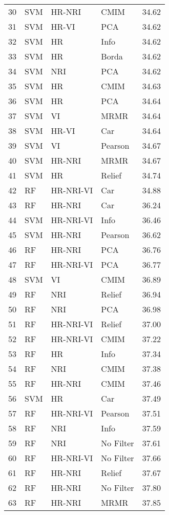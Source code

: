 \begin{table}[ht]
\begin{tabular}{rlllr}
  30 & SVM & HR-NRI & CMIM & 34.62 \\ 
  31 & SVM & HR-VI & PCA & 34.62 \\ 
  32 & SVM & HR & Info & 34.62 \\ 
  33 & SVM & HR & Borda & 34.62 \\ 
  34 & SVM & NRI & PCA & 34.62 \\ 
  35 & SVM & HR & CMIM & 34.63 \\ 
  36 & SVM & HR & PCA & 34.64 \\ 
  37 & SVM & VI & MRMR & 34.64 \\ 
  38 & SVM & HR-VI & Car & 34.64 \\ 
  39 & SVM & VI & Pearson & 34.67 \\ 
  40 & SVM & HR-NRI & MRMR & 34.67 \\ 
  41 & SVM & HR & Relief & 34.74 \\ 
  42 & RF & HR-NRI-VI & Car & 34.88 \\ 
  43 & RF & HR-NRI & Car & 36.24 \\ 
  44 & SVM & HR-NRI-VI & Info & 36.46 \\ 
  45 & SVM & HR-NRI & Pearson & 36.62 \\ 
  46 & RF & HR-NRI & PCA & 36.76 \\ 
  47 & RF & HR-NRI-VI & PCA & 36.77 \\ 
  48 & SVM & VI & CMIM & 36.89 \\ 
  49 & RF & NRI & Relief & 36.94 \\ 
  50 & RF & NRI & PCA & 36.98 \\ 
  51 & RF & HR-NRI-VI & Relief & 37.00 \\ 
  52 & RF & HR-NRI-VI & CMIM & 37.22 \\ 
  53 & RF & HR & Info & 37.34 \\ 
  54 & RF & NRI & CMIM & 37.38 \\ 
  55 & RF & HR-NRI & CMIM & 37.46 \\ 
  56 & SVM & HR & Car & 37.49 \\ 
  57 & RF & HR-NRI-VI & Pearson & 37.51 \\ 
  58 & RF & NRI & Info & 37.59 \\ 
  59 & RF & NRI & No Filter & 37.61 \\ 
  60 & RF & HR-NRI-VI & No Filter & 37.66 \\ 
  61 & RF & HR-NRI & Relief & 37.67 \\ 
  62 & RF & HR-NRI & No Filter & 37.80 \\ 
  63 & RF & HR-NRI & MRMR & 37.85 \\ 

\end{tabular}
\end{table}
